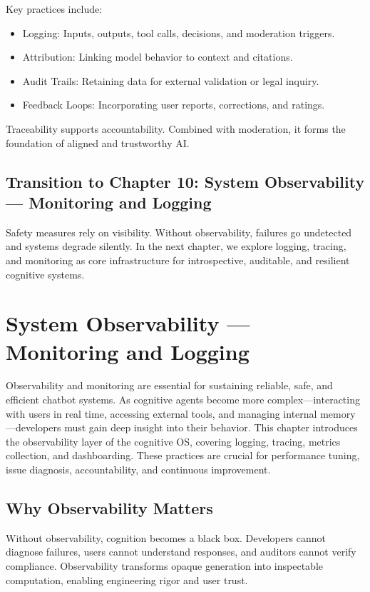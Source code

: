 \documentclass{book}
\begin{document}
Key practices include:

\begin{itemize}
  \item Logging: Inputs, outputs, tool calls, decisions, and moderation triggers.
  \item Attribution: Linking model behavior to context and citations.
  \item Audit Trails: Retaining data for external validation or legal inquiry.
  \item Feedback Loops: Incorporating user reports, corrections, and ratings.
\end{itemize}

Traceability supports accountability. Combined with moderation, it forms the foundation of aligned and trustworthy AI.

\section*{Transition to Chapter 10: System Observability — Monitoring and Logging}

Safety measures rely on visibility. Without observability, failures go undetected and systems degrade silently. In the next chapter, we explore logging, tracing, and monitoring as core infrastructure for introspective, auditable, and resilient cognitive systems.

\chapter{System Observability — Monitoring and Logging}

Observability and monitoring are essential for sustaining reliable, safe, and efficient chatbot systems. As cognitive agents become more complex—interacting with users in real time, accessing external tools, and managing internal memory—developers must gain deep insight into their behavior. This chapter introduces the observability layer of the cognitive OS, covering logging, tracing, metrics collection, and dashboarding. These practices are crucial for performance tuning, issue diagnosis, accountability, and continuous improvement.

\section{Why Observability Matters}

Without observability, cognition becomes a black box. Developers cannot diagnose failures, users cannot understand responses, and auditors cannot verify compliance. Observability transforms opaque generation into inspectable computation, enabling engineering rigor and user trust.
\end{document}
